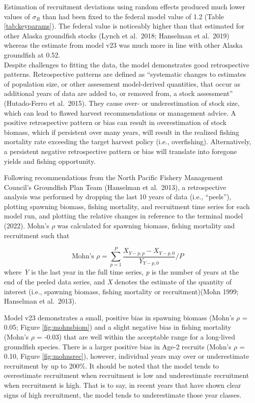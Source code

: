 \documentclass[
]{article}
\begin{document}
Estimation of recruitment deviations using random effects produced much lower values of \(\sigma_R\) than had been fixed to the federal model value of 1.2 (Table \ref{tab:keyparams}). The federal value is noticeably higher than that estimated for other Alaska groundfish stocks (Lynch et al.~2018; Hanselman et al.~2019) whereas the estimate from model v23 was much more in line with other Alaska groundfish at 0.52.\\
Despite challenges to fitting the data, the model demonstrates good retrospective patterns. Retrospective patterns are defined as ``systematic changes to estimates of population size, or other assessment model-derived quantities, that occur as additional years of data are added to, or removed from, a stock assessment'' (Hutado-Ferro et al.~2015). They cause over- or underestimation of stock size, which can lead to flawed harvest recommendations or management advice. A positive retrospective pattern or bias can result in overestimation of stock biomass, which if persistent over many years, will result in the realized fishing mortality rate exceeding the target harvest policy (i.e., overfishing). Alternatively, a persistent negative retrospective pattern or bias will translate into foregone yields and fishing opportunity.

Following recommendations from the North Pacific Fishery Management Council's Groundfish Plan Team (Hanselman et al.~2013), a retrospective analysis was performed by dropping the last 10 years of data (i.e., ``peels''), plotting spawning biomass, fishing mortality, and recruitment time series for each model run, and plotting the relative changes in reference to the terminal model (2022). Mohn's \(\rho\) was calculated for spawning biomass, fishing mortality and recruitment such that

\[
\begin{equation}
\text{Mohn's } \rho=\sum_{p=1}^{P}\frac{X_{Y-p,p}-X_{Y-p,0}}{Y_{Y-p,0}}/P
\label{eq:mohns}
\end{equation} 
\]
where \emph{Y} is the last year in the full time series, \emph{p} is the number of years at the end of the peeled data series, and \emph{X} denotes the estimate of the quantity of interest (i.e., spawning biomass, fishing mortality or recruitment)(Mohn 1999; Hanselman et al.~2013).

Model v23 demonstrates a small, positive bias in spawning biomass (Mohn's \(\rho\) = 0.05; Figure \ref{fig:mohnsbiom}) and a slight negative bias in fishing mortality (Mohn's \(\rho\) = -0.03) that are well within the acceptable range for a long-lived groundfish species. There is a larger positive bias in Age-2 recruits (Mohn's \(\rho\) = 0.10, Figure \ref{fig:mohnsrec}), however, individual years may over or underestimate recruitment by up to 200\%. It should be noted that the model tends to overestimate recruitment when recruitment is low and underestimate recruitment when recruitment is high. That is to say, in recent years that have shown clear signs of high recruitment, the model tends to underestimate those year classes.
\end{document}

